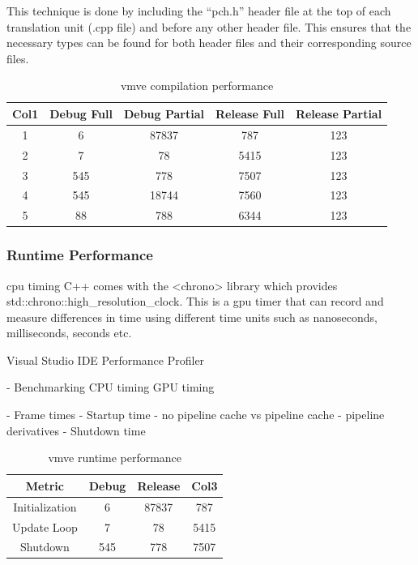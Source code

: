\documentclass[11pt]{article}
\begin{document}
This technique is done by including the ``pch.h'' header file at the top of each
translation unit (.cpp file) and before any other header file. This ensures that
the necessary types can be found for both header files and their corresponding
source files.

\begin{table}[h!]
\centering
\begin{tabular}{||c c c c c ||} 
  \hline
  Col1 & Debug Full & Debug Partial  & Release Full & Release Partial \\ [0.5ex] 
  \hline\hline
  1 & 6 & 87837 & 787 & 123 \\ 
  2 & 7 & 78 & 5415 & 123 \\
  3 & 545 & 778 & 7507 & 123 \\
  4 & 545 & 18744 & 7560 & 123  \\
  5 & 88 & 788 & 6344 & 123 \\ [1ex] 
  \hline
\end{tabular}
\caption{\gls{vmve} compilation performance}
\label{fig:compilation_performance}
\end{table}



\subsubsection{Runtime Performance}

\gls{cpu} timing C++ comes with the <chrono> library which provides
std::chrono::high\_resolution\_clock. This is a \gls{gpu} timer that
can record and measure differences in time using different
time units such as nanoseconds, milliseconds, seconds etc.

Visual Studio IDE Performance
Profiler

- Benchmarking
    CPU timing
    GPU timing


- Frame times
- Startup time
	- no pipeline cache vs pipeline cache
	- pipeline derivatives
- Shutdown time


\begin{table}[h!]
\centering
\begin{tabular}{||c c c c||} 
  \hline
  Metric & Debug & Release & Col3 \\ [0.5ex] 
  \hline\hline
  Initialization & 6 & 87837 & 787 \\ 
  Update Loop & 7 & 78 & 5415 \\
  Shutdown & 545 & 778 & 7507 \\ [1ex] 
  \hline
\end{tabular}
\caption{\gls{vmve} runtime performance}
\label{fig:runtime_performance}
\end{table}
\end{document}
